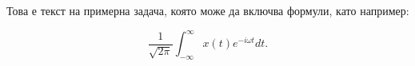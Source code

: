 \documentclass[class=eexam, crop=false]{standalone}
\begin{document}
Това е текст на примерна задача, която може да включва формули, като например:

\begin{equation*}
  \frac 1{\sqrt{2\pi}} \int^\infty_{-\infty}x(t)e^{-i\omega t}dt.
\end{equation*}
\end{document}
